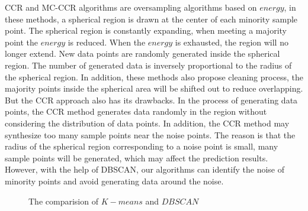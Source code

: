 \documentclass[ida]{iosart2x}
\begin{document}
CCR \cite{2017CCR} and MC-CCR \cite{2020Combined} algorithms are oversampling algorithms based on $energy$,
in these methods, a spherical region is drawn at the center of each minority sample point. 
The spherical region is constantly expanding, when meeting a majority point the $energy$ is reduced.
When the $energy$ is exhausted, the region will no longer extend.
New data points are randomly generated inside the spherical region. 
The number of generated data is inversely proportional to the radius of the spherical region.
In addition, these methods also propose cleaning process, 
the majority points inside the spherical area will be shifted out to reduce overlapping.
But the CCR approach also has its drawbacks. In the process of generating data points,
the CCR method generates data randomly in the region without considering the distribution of data points.
In addition, the CCR method may synthesize too many sample points near the noise points. 
The reason is that the radius of the spherical region corresponding 
to a noise point is small, 
many sample points will be generated, which may affect the prediction results.
However, with the help of DBSCAN, our algorithms can identify the noise of minority points and 
avoid generating data around the noise.

\begin{figure}[tb]
  \centering
  \quad
  \caption{The comparision of $K-means$ and $DBSCAN$}
  \label{fig19}
  \end{figure}
\end{document}

